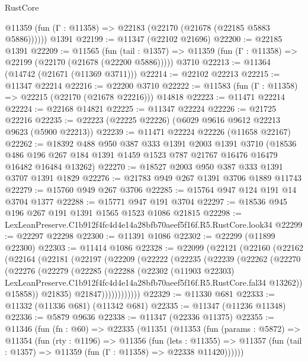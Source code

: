 \begin{lexlean}{RustCore}
\begin{coremodule}
      @11359 (fun (Γ : @11358) => @22183 (@22170 (@21678 (@22185 @5883 @5886))))))
    @1391
@22199 := @11347 (@22102 @21696)
@22200 := @22185 @1391
@22209 := @11565
    (fun (tail : @1357) => @11359 (fun (Γ : @11358) => @22199 (@22170 (@21678 (@22200 @5886)))))
    @3710
@22213 := @11364 (@14742 (@21671 (@11369 @3711)))
@22214 := @22102 @22213
@22215 := @11347 @22214
@22216 := @22200 @3710
@22222 := @11583 (fun (Γ : @11358) => @22215 (@22170 (@21678 @22216))) @14818
@22223 := @11471 @22214
@22224 := @22168 @14821
@22225 := @11347 @22224
@22226 := @21725 @22216
@22235 := @22223 (@22225 @22226) (@6029 @9616 @9612 @22213 @9623 (@5900 @22213))
@22239 := @11471 @22224 @22226 (@11658 @22167)
@22262 := @18392
    @488
    @950
    @387
    @333
    @1391
    @2003
    @1391
    @3710
    (@18536 @486 @196 @267 @184 @1391 @1459 @1523 @787 @21767 @16476 @16479 @16482 @16484 @13262)
@22270 := @18527 @2003 @950 @387 @333 @1391 @3707 @1391 @1829
@22276 := @21783 @949 @267 @1391 @3706 @1889 @11743
@22279 := @15760 @949 @267 @3706
@22285 := @15764 @947 @124 @191 @14 @3704 @1377
@22288 := @15771 @947 @191 @3704
@22297 := @18536 @945 @196 @267 @191 @1391 @1565 @1523 @1086 @21815
@22298 := LexLeanPreserve.C1b912f4fc4d4e14a28bfb70aeef5f16f.R5.RustCore.look34
@22299 := @22297 @22298
@22300 := @11391 @1086
@22302 := @22299 (@11899 @22300)
@22303 := @11414 @1086
@22328 := @22099
    (@22121
      (@22160
        (@22162
          (@22164
            (@22181
              (@22197
                (@22209
                  (@22222
                    (@22235
                      (@22239
                        (@22262
                          (@22270
                            (@22276
                              (@22279
                                (@22285
                                  (@22288
                                    (@22302
                                      (@11903 @22303)
                                      LexLeanPreserve.C1b912f4fc4d4e14a28bfb70aeef5f16f.R5.RustCore.fal34
                                      @13262))
                                  @15858))
                              @21835)
                            @21847))))))))))))
@22329 := @11330 @681
@22333 := @11332 (@11336 @681) (@11342 @681)
@22335 := @11347 (@11236 @11348)
@22336 := @5879 @9636
@22338 := @11347 (@22336 @11375)
@22355 := @11346
    (fun (fn : @60) =>
    @22335
      (@11351
        (@11353
          (fun (params : @5872) =>
          @11354
            (fun (rty : @1196) =>
            @11356
              (fun (lets : @11355) =>
              @11357 (fun (tail : @1357) => @11359 (fun (Γ : @11358) => @22338 @11420))))))

\end{coremodule}
\end{lexlean}

